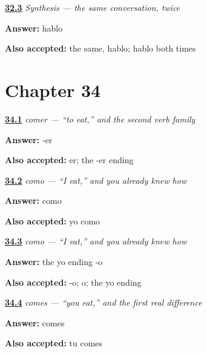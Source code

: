\noindent\begin{minipage}[t]{\linewidth}
\raggedright
\hyperlink{review-ES-C06-repaso-hablar-self}{\textbf{32.3}} \emph{Synthesis — the same conversation, twice}\par
\small \textbf{Answer:} hablo\par
\footnotesize \textbf{Also accepted:} the same, hablo; hablo both times
\end{minipage}\par\medskip

\section*{Chapter 34}

\noindent\begin{minipage}[t]{\linewidth}
\raggedright
\hyperlink{review-ES-C07-comer-family}{\textbf{34.1}} \emph{comer — \textquotedblleft{}to eat,\textquotedblright{} and the second verb family}\par
\small \textbf{Answer:} -er\par
\footnotesize \textbf{Also accepted:} er; the -er ending
\end{minipage}\par\medskip

\noindent\begin{minipage}[t]{\linewidth}
\raggedright
\hyperlink{review-ES-C07-como-form}{\textbf{34.2}} \emph{como — \textquotedblleft{}I eat,\textquotedblright{} and you already knew how}\par
\small \textbf{Answer:} como\par
\footnotesize \textbf{Also accepted:} yo como
\end{minipage}\par\medskip

\noindent\begin{minipage}[t]{\linewidth}
\raggedright
\hyperlink{review-ES-C07-como-same}{\textbf{34.3}} \emph{como — \textquotedblleft{}I eat,\textquotedblright{} and you already knew how}\par
\small \textbf{Answer:} the yo ending -o\par
\footnotesize \textbf{Also accepted:} -o; o; the yo ending
\end{minipage}\par\medskip

\noindent\begin{minipage}[t]{\linewidth}
\raggedright
\hyperlink{review-ES-C07-comes-form}{\textbf{34.4}} \emph{comes — \textquotedblleft{}you eat,\textquotedblright{} and the first real difference}\par
\small \textbf{Answer:} comes\par
\footnotesize \textbf{Also accepted:} tu comes
\end{minipage}\par\medskip

